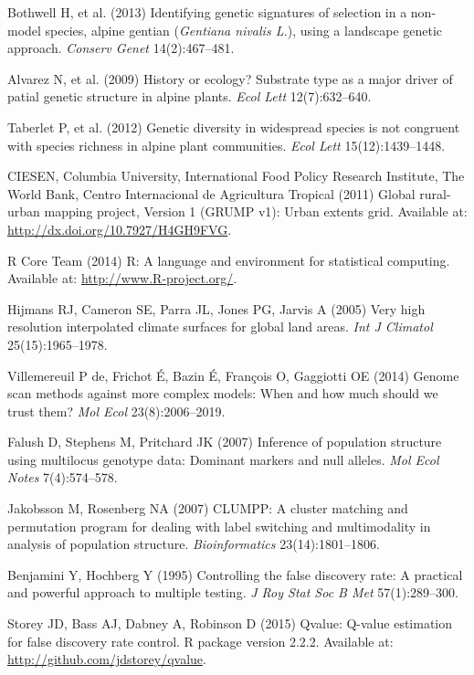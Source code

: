\documentclass[9pt,twocolumn,twoside,lineno]{pnas-new}
\begin{document}
\begin{thebibliography}{100}
Bothwell H, et al. (2013) Identifying genetic signatures of
selection in a non-model species, alpine gentian (\emph{Gentiana nivalis
L.}), using a landscape genetic approach. \emph{Conserv Genet}
14(2):467--481.

Alvarez N, et al. (2009) History or ecology? Substrate type as a
major driver of patial genetic structure in alpine plants. \emph{Ecol
Lett} 12(7):632--640.

Taberlet P, et al. (2012) Genetic diversity in widespread species is
not congruent with species richness in alpine plant communities.
\emph{Ecol Lett} 15(12):1439--1448.

CIESEN, Columbia University, International Food Policy Research
Institute, The World Bank, Centro Internacional de Agricultura Tropical
(2011) Global rural-urban mapping project, Version 1 (GRUMP v1): Urban
extents grid. Available at: \url{http://dx.doi.org/10.7927/H4GH9FVG}.

R Core Team (2014) R: A language and environment for statistical
computing. Available at: \url{http://www.R-project.org/}.

Hijmans RJ, Cameron SE, Parra JL, Jones PG, Jarvis A (2005) Very
high resolution interpolated climate surfaces for global land areas.
\emph{Int J Climatol} 25(15):1965--1978.

Villemereuil P de, Frichot É, Bazin É, François O, Gaggiotti OE
(2014) Genome scan methods against more complex models: When and how
much should we trust them? \emph{Mol Ecol} 23(8):2006--2019.

Falush D, Stephens M, Pritchard JK (2007) Inference of population
structure using multilocus genotype data: Dominant markers and null
alleles. \emph{Mol Ecol Notes} 7(4):574--578.

Jakobsson M, Rosenberg NA (2007) CLUMPP: A cluster matching and
permutation program for dealing with label switching and multimodality
in analysis of population structure. \emph{Bioinformatics}
23(14):1801--1806.

Benjamini Y, Hochberg Y (1995) Controlling the false discovery rate:
A practical and powerful approach to multiple testing. \emph{J Roy Stat
Soc B Met} 57(1):289--300.

Storey JD, Bass AJ, Dabney A, Robinson D (2015) Qvalue: Q-value
estimation for false discovery rate control. R package version 2.2.2.
Available at: \url{http://github.com/jdstorey/qvalue}.


\end{thebibliography}
\end{document}
